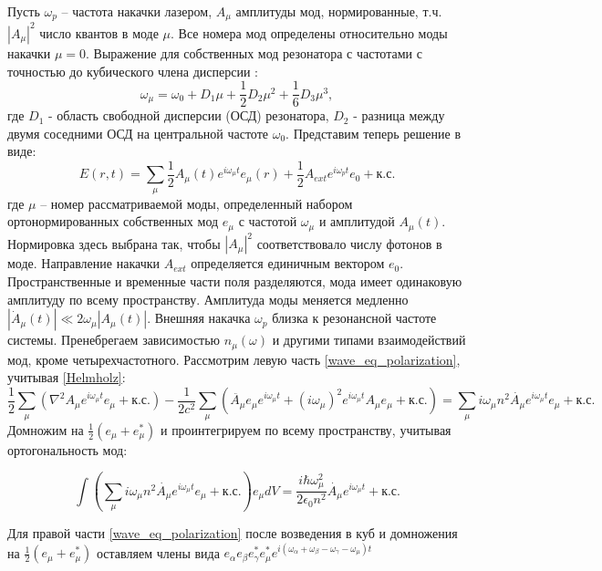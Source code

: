 Пусть $\omega_p$ -- частота накачки лазером, $A_\mu$ амплитуды мод, нормированные, т.ч. $|A_\mu|^2$ число квантов в моде $\mu$. Все номера мод определены относительно моды накачки $\mu=0$. Выражение для собственных мод резонатора с частотами с точностью до кубического члена дисперсии \cite{Herr2012}:
\begin{equation}\label{dispersion_eq}
\omega_\mu=\omega_0+D_1\mu+\frac{1}{2}D_2\mu^2+\frac{1}{6}D_3\mu^3,
\end{equation}
где $D_1$ - область свободной дисперсии (ОСД) резонатора, $D_2$ - разница между двумя соседними ОСД на центральной частоте $\omega_0$. Представим теперь решение в виде:
\begin{equation}\label{SMA_E}
E(r,t)=\sum_\mu\frac{1}{2}A_\mu(t)e^{i\omega_\mu t}e_\mu(r)+\frac{1}{2}A_{ext}e^{i\omega_pt}e_0+\text{к.с.}
\end{equation}
где $\mu$ -- номер рассматриваемой моды, определенный набором ортонормированных собственных мод $e_\mu$ с частотой $\omega_\mu$ и амплитудой $A_\mu(t)$. Нормировка здесь выбрана так, чтобы $|A_\mu|^2$ соответствовало числу фотонов в моде. Направление накачки $A_{ext}$ определяется единичным вектором $e_0$. Пространственные и временные части поля разделяются, мода имеет одинаковую амплитуду по всему пространству. Амплитуда моды меняется медленно $|\dot{A}_\mu(t)|\ll2\omega_\mu|A_\mu(t)|$. Внешняя накачка $\omega_p$ близка к резонансной частоте системы. Пренебрегаем зависимостью $n_\mu(\omega)$ и другими типами взаимодействий мод, кроме четырехчастотного. Рассмотрим левую часть \eqref{wave_eq_polarization}, учитывая \eqref{Helmholz}:
%
\begin{equation}
\frac{1}{2}\sum_\mu(\nabla^2A_\mu e^{i\omega_\mu t}e_\mu+\text{к.с.})-\frac{1}{2c^2}\sum_\mu(\ddot{A_\mu}e_\mu e^{i\omega_\mu t}+(i\omega_\mu)^2e^{i\omega_\mu t}A_\mu e_\mu+\text{к.с.})=\sum_\mu i\omega_\mu n^2 \dot{A_\mu}e^{i\omega_\mu t}e_\mu+\text{к.с.}
\end{equation}
%
Домножим на $\frac{1}{2}(e_\mu+e_\mu^*)$ и проинтегрируем по всему пространству, учитывая ортогональность мод:

\begin{equation}
\int(\sum_\mu i\omega_\mu n^2 \dot{A_\mu}e^{i\omega_\mu t}e_\mu+\text{к.с.})e_\mu dV=\frac{i\hbar\omega_\mu^2}{2\epsilon_0n^2}\dot{A_\mu}e^{i\omega_\mu t}+\text{к.с.}
\end{equation}

Для правой части \eqref{wave_eq_polarization} после возведения в куб и домножения на $\frac{1}{2}(e_\mu+e_\mu^*)$ оставляем члены вида $e_\alpha e_\beta e_\gamma^* e_\mu^* e^{i(\omega_\alpha+\omega_\beta-\omega_\gamma-\omega_\mu)t}$

